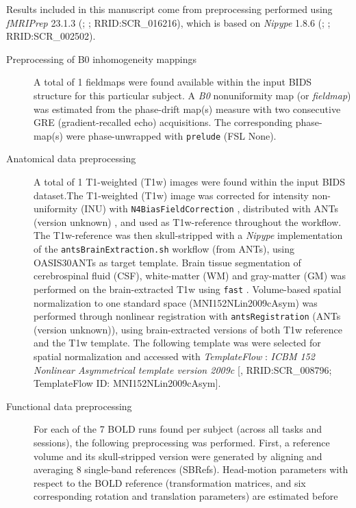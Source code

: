 \documentclass[
]{article}
\author{}
\date{}
\begin{document}
Results included in this manuscript come from preprocessing performed
using \emph{fMRIPrep} 23.1.3 (\citet{fmriprep1}; \citet{fmriprep2};
RRID:SCR\_016216), which is based on \emph{Nipype} 1.8.6
(\citet{nipype1}; \citet{nipype2}; RRID:SCR\_002502).

\begin{description}
\item[Preprocessing of B0 inhomogeneity mappings]
A total of 1 fieldmaps were found available within the input BIDS
structure for this particular subject. A \emph{B0} nonuniformity map (or
\emph{fieldmap}) was estimated from the phase-drift map(s) measure with
two consecutive GRE (gradient-recalled echo) acquisitions. The
corresponding phase-map(s) were phase-unwrapped with \texttt{prelude}
(FSL None).
\item[Anatomical data preprocessing]
A total of 1 T1-weighted (T1w) images were found within the input BIDS
dataset.The T1-weighted (T1w) image was corrected for intensity
non-uniformity (INU) with \texttt{N4BiasFieldCorrection} \citep{n4},
distributed with ANTs (version unknown) \citep[RRID:SCR\_004757]{ants},
and used as T1w-reference throughout the workflow. The T1w-reference was
then skull-stripped with a \emph{Nipype} implementation of the
\texttt{antsBrainExtraction.sh} workflow (from ANTs), using OASIS30ANTs
as target template. Brain tissue segmentation of cerebrospinal fluid
(CSF), white-matter (WM) and gray-matter (GM) was performed on the
brain-extracted T1w using \texttt{fast} \citep[FSL (version unknown),
RRID:SCR\_002823,][]{fsl_fast}. Volume-based spatial normalization to
one standard space (MNI152NLin2009cAsym) was performed through nonlinear
registration with \texttt{antsRegistration} (ANTs (version unknown)),
using brain-extracted versions of both T1w reference and the T1w
template. The following template was were selected for spatial
normalization and accessed with \emph{TemplateFlow}
\citep[23.0.0,][]{templateflow}: \emph{ICBM 152 Nonlinear Asymmetrical
template version 2009c} {[}\citet{mni152nlin2009casym},
RRID:SCR\_008796; TemplateFlow ID: MNI152NLin2009cAsym{]}.
\item[Functional data preprocessing]
For each of the 7 BOLD runs found per subject (across all tasks and
sessions), the following preprocessing was performed. First, a reference
volume and its skull-stripped version were generated by aligning and
averaging 8 single-band references (SBRefs). Head-motion parameters with
respect to the BOLD reference (transformation matrices, and six
corresponding rotation and translation parameters) are estimated before

\end{description}
\end{document}

